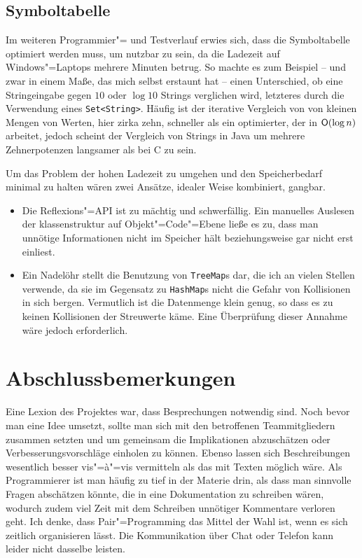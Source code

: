 \documentclass[10pt,a4paper,ngerman,titlepage,tocindentauto]{scrartcl}
\begin{document}
		\subsection[Symboltabelle]{\hypertarget{Offene_Baustellen_Symboltabelle}{Symboltabelle}}
			Im weiteren Programmier"= und Testverlauf erwies sich, dass die Symboltabelle optimiert werden muss, um
			nutzbar zu sein, da die Ladezeit auf Windows"=Laptops mehrere Minuten betrug. So machte es zum Beispiel -- und zwar in einem Maße,
			das mich selbst erstaunt hat -- einen Unterschied, ob eine Stringeingabe gegen $10$ oder $\log 10$ Strings verglichen
			wird, letzteres durch die Verwendung eines \verb|Set<String>|. Häufig ist der iterative Vergleich von von kleinen
			Mengen von Werten, hier zirka zehn, schneller als ein optimierter, der in $\textsf O\!\left(\log n\right)$ arbeitet,
			jedoch scheint der Vergleich von Strings in Java um mehrere Zehnerpotenzen langsamer als bei C zu sein.
			
			Um das Problem der hohen Ladezeit zu umgehen und den Speicherbedarf minimal zu halten wären zwei Ansätze,
			idealer Weise kombiniert, gangbar.
			\begin{itemize}
				\item
					Die Reflexions"=API ist zu mächtig und schwerfällig. Ein manuelles Auslesen der klassenstruktur
					auf Objekt"=Code"=Ebene ließe es zu, dass man unnötige Informationen nicht im Speicher hält beziehungsweise
					gar nicht erst einliest.
				\item
					Ein Nadelöhr stellt die
					Benutzung von \texttt{TreeMap}s dar, die ich an vielen Stellen verwende, da sie im Gegensatz zu \texttt{HashMap}s
					nicht die Gefahr von Kollisionen in sich bergen. Vermutlich ist die Datenmenge klein genug, so dass es zu keinen
					Kollisionen der Streuwerte käme. Eine Überprüfung dieser Annahme wäre jedoch erforderlich.
			\end{itemize}
	
	\section[Abschlussbemerkungen]{\hypertarget{Abschlussbemerkungen}{Abschlussbemerkungen}}
		Eine Lexion des Projektes war, dass Besprechungen notwendig sind. Noch bevor man eine Idee umsetzt, sollte man
		sich mit den betroffenen Teammitgliedern zusammen setzten und um gemeinsam die Implikationen abzuschätzen
		oder Verbesserungsvorschläge einholen zu können. Ebenso lassen sich Beschreibungen wesentlich besser vis"=à"=vis
		vermitteln als das mit Texten möglich wäre. Als Programmierer ist man häufig zu tief in der Materie drin, als dass
		man sinnvolle Fragen abschätzen könnte, die in eine Dokumentation zu schreiben wären, wodurch zudem viel Zeit
		mit dem Schreiben unnötiger Kommentare verloren geht. Ich denke, dass Pair"=Programming das Mittel der Wahl ist,
		wenn es sich zeitlich organisieren lässt. Die Kommunikation über Chat oder Telefon kann leider nicht dasselbe leisten.
		
\end{document}
